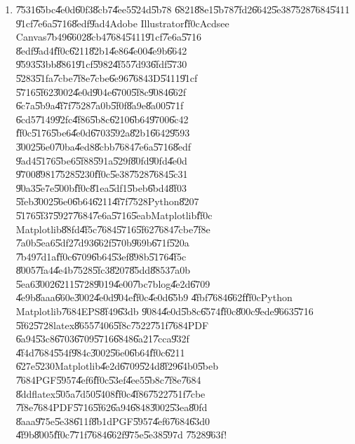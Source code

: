 \begin{enumerate}
\item \U{7531}\U{65bc}\U{4e0d}\U{60f3}\U{8cb7}\U{4ee5}\U{524d}\U{5b78}%
\U{6821}\U{88e1}\U{5b78}\U{7fd2}\U{6642}\U{5e38}\U{7528}\U{7684}\U{5411}%
\U{91cf}\U{7e6a}\U{5716}\U{8edf}\U{9ad4}Adobe Illustrator\U{ff0c}Acdsee
Canvas\U{7b49}\U{6602}\U{8cb4}\U{7684}\U{5411}\U{91cf}\U{7e6a}\U{5716}%
\U{8edf}\U{9ad4}\U{ff0c}\U{6211}\U{82b1}\U{4e86}\U{4e00}\U{4e9b}\U{6642}%
\U{9593}\U{53bb}\U{8861}\U{91cf}\U{5982}\U{4f55}\U{7d93}\U{6fdf}\U{5730}%
\U{5283}\U{51fa}\U{7cbe}\U{7f8e}\U{7cbe}\U{6e96}\U{7684}3D\U{5411}\U{91cf}%
\U{5716}\U{5f62}\U{3002}\U{4e0d}\U{904e}\U{6700}\U{5f8c}\U{9084}\U{662f}%
\U{6c7a}\U{5b9a}\U{4f7f}\U{7528}\U{7a0b}\U{5f0f}\U{8a9e}\U{8a00}\U{571f}%
\U{6cd5}\U{7149}\U{92fc}\U{4f86}\U{5b8c}\U{6210}\U{6b64}\U{9700}\U{6c42}%
\U{ff0c}\U{5176}\U{5be6}\U{4e0d}\U{6703}\U{592a}\U{82b1}\U{6642}\U{9593}%
\U{3002}\U{56e0}\U{70ba}\U{4ed8}\U{8cbb}\U{7684}\U{7e6a}\U{5716}\U{8edf}%
\U{9ad4}\U{5176}\U{5be6}\U{5f88}\U{591a}\U{529f}\U{80fd}\U{90fd}\U{4e0d}%
\U{9700}\U{8981}\U{7528}\U{5230}\U{ff0c}\U{5e38}\U{7528}\U{7684}\U{5c31}%
\U{90a3}\U{5e7e}\U{500b}\U{ff0c}\U{81ea}\U{5df1}\U{5beb}\U{6bd4}\U{8f03}%
\U{5feb}\U{3002}\U{56e0}\U{6b64}\U{6211}\U{4f7f}\U{7528}Python\U{8207}%
\U{5176}\U{5f37}\U{5927}\U{7684}\U{7e6a}\U{5716}\U{5eab}Matplotlib\U{ff0c}%
Matplotlib\U{88fd}\U{4f5c}\U{7684}\U{5716}\U{5f62}\U{7684}\U{7cbe}\U{7f8e}%
\U{7a0b}\U{5ea6}\U{5df2}\U{7d93}\U{662f}\U{570b}\U{969b}\U{671f}\U{520a}%
\U{7b49}\U{7d1a}\U{ff0c}\U{6709}\U{6b64}\U{53ef}\U{898b}\U{5176}\U{4f5c}%
\U{8005}\U{7fa4}\U{4e4b}\U{7528}\U{5fc3}\U{8207}\U{85dd}\U{8853}\U{7a0b}%
\U{5ea6}\U{3002}\U{6211}\U{5728}\U{9019}\U{4e00}\U{7bc7}blog\U{4e2d}\U{6709}%
\U{4e9b}\U{8aaa}\U{660e}\U{3002}\U{4e0d}\U{904e}\U{ff0c}\U{4e0d}\U{65b9}%
\U{4fbf}\U{7684}\U{662f}\U{ff0c}Python Matplotlib\U{7684}EPS\U{8f49}\U{63db}%
\U{9084}\U{4e0d}\U{5b8c}\U{6574}\U{ff0c}\U{800c}\U{9ede}\U{9663}\U{5716}%
\U{5f62}\U{5728}latex\U{8655}\U{7406}\U{5f8c}\U{7522}\U{751f}\U{7684}PDF%
\U{6a94}\U{53c8}\U{6703}\U{6709}\U{5716}\U{6848}\U{6a21}\U{7cca}\U{932f}%
\U{4f4d}\U{7684}\U{554f}\U{984c}\U{3002}\U{56e0}\U{6b64}\U{ff0c}\U{6211}%
\U{627e}\U{5230}Matplotlib\U{4e2d}\U{6709}\U{524d}\U{8f29}\U{64b0}\U{5beb}%
\U{7684}PGF\U{5957}\U{4ef6}\U{ff0c}\U{53ef}\U{4ee5}\U{5b8c}\U{7f8e}\U{7684}%
\U{8ddf}latex\U{505a}\U{7d50}\U{5408}\U{ff0c}\U{4f86}\U{7522}\U{751f}\U{7cbe}%
\U{7f8e}\U{7684}PDF\U{5716}\U{5f62}\U{6a94}\U{6848}\U{3002}\U{53ea}\U{80fd}%
\U{8aaa}\U{975e}\U{5e38}\U{611f}\U{8b1d}PGF\U{5957}\U{4ef6}\U{7684}\U{63d0}%
\U{4f9b}\U{8005}\U{ff0c}\U{771f}\U{7684}\U{662f}\U{975e}\U{5e38}\U{597d}%
\U{7528}\U{963f}!


\end{enumerate}
